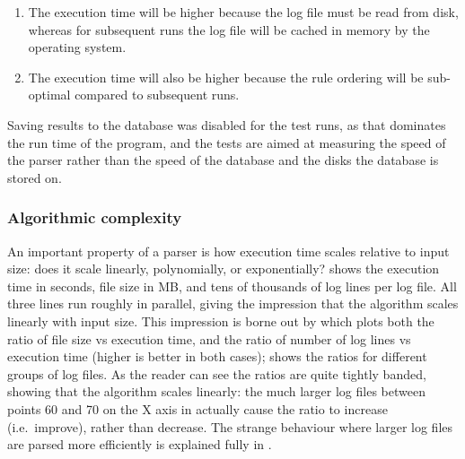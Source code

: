 \begin{enumerate}

    \item The execution time will be higher because the log file must be
        read from disk, whereas for subsequent runs the log file will be
        cached in memory by the operating system.

    \item The execution time will also be higher because the rule ordering
        will be sub-optimal compared to subsequent runs.

\end{enumerate}

Saving results to the database was disabled for the test runs, as that
dominates the run time of the program, and the tests are aimed at measuring
the speed of the parser rather than the speed of the database and the disks
the database is stored on.

\newpage

\subsubsection{Algorithmic complexity}

An important property of a parser is how execution time scales relative to
input size: does it scale linearly, polynomially, or exponentially?
 shows the
execution time in seconds, file size in MB, and tens of thousands of log
lines per log file.  All three lines run roughly in parallel, giving the
impression that the algorithm scales linearly with input size.  This
impression is borne out by  which plots both the ratio of file size vs execution time,
and the ratio of number of log lines vs execution time (higher is better in
both cases);  shows the ratios for different groups of log files.  As the
reader can see the ratios are quite tightly banded, showing that the
algorithm scales linearly: the much larger log files between points 60 and
70 on the X axis in  actually cause the ratio to increase (i.e.\ improve), rather
than decrease.  The strange behaviour where larger log files are parsed
more efficiently is explained fully in .  



